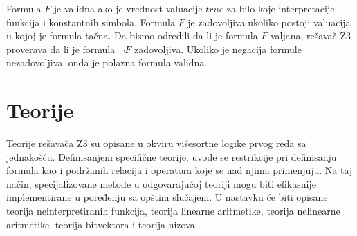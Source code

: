 \documentclass[12pt,oneside]{memoir}
\newtheorem{primer}{Primer}
\begin{document}
Formula $F$ je validna ako je vrednost valuacije $true$ za bilo koje interpretacije funkcija i konstantnih simbola. Formula $F$ je zadovoljiva ukoliko postoji valuacija u kojoj je formula tačna. Da bismo odredili da li je formula $F$ valjana, rešavač Z3 proverava da li je formula $\lnot F$ zadovoljiva. Ukoliko je negacija formule nezadovoljiva, onda je polazna formula validna. 

 


\section{Teorije} \label{sec:num2}
Teorije rešavača Z3 su opisane u okviru višesortne logike prvog reda sa jednakošću.  Definisanjem specifične teorije, uvode se restrikcije pri definisanju formula kao i podržanih relacija i operatora koje se nad njima primenjuju. Na taj način, specijalizovane metode u odgovarajućoj teoriji mogu biti efikasnije implementirane u poređenju sa opštim slučajem. U nastavku će biti opisane teorija neinterpretiranih funkcija, teorija linearne aritmetike, teorija nelinearne aritmetike, teorija bitvektora i teorija nizova.
\end{document}
